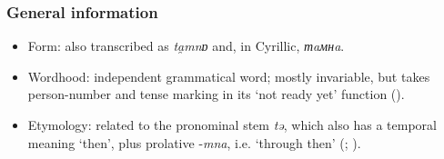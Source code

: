 \subsubsection{General information}
\begin{itemize}
	\sloppy
	\item Form: also transcribed as \textit{ta̯mnɒ} and, in Cyrillic, \textit{тaмнa}. 
	\item Wordhood: independent grammatical word; mostly invariable, but takes person\hyp number and tense marking in its \lq not ready yet' function ().
	\item Etymology: related to the pronominal stem \textit{tə}, which also has a temporal meaning \lq then\rq{}, plus prolative \mbox{-\textit{mna}}, i.e. \lq through then\rq{ }(\cite[144]{Janhunen1977}; \cite[199]{Salminen1998}).
\end{itemize}

\largerpage
